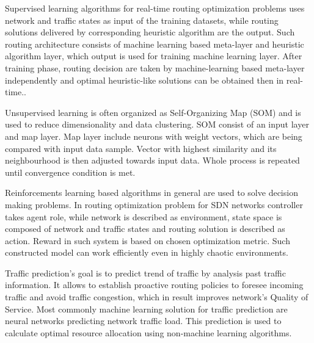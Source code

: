 \documentclass[conference]{IEEEtran}
\begin{document}
Supervised learning algorithms for real-time routing optimization problems uses network and traffic states as input of the training datasets, while routing solutions delivered by corresponding heuristic algorithm are the output. Such routing architecture consists of machine learning based meta-layer and heuristic algorithm layer, which output is used for training machine learning layer. After training phase, routing decision are taken by machine-learning based meta-layer independently and optimal heuristic-like solutions can be obtained then in real-time.\cite{routing3}.\par
Unsupervised learning is often organized as Self-Organizing Map (SOM) and is used to reduce dimensionality and data clustering. SOM consist of an input layer and map layer. Map layer include neurons with weight vectors, which are being compared with input data sample. Vector with highest similarity and its neighbourhood is then adjusted towards input data. Whole process is repeated until convergence condition is met\cite{routing3}.\par
Reinforcements learning based algorithms in general are used to solve decision making problems. In routing optimization problem for SDN networks controller takes agent role, while network is described as environment, state space is composed of network and traffic states and routing solution is described as action. Reward in such system is based on chosen optimization metric. Such constructed model can work efficiently even in highly chaotic environments\cite{routing3}.\par
Traffic prediction's goal is to predict trend of traffic by analysis past traffic information. It allows to establish proactive routing policies to foresee incoming traffic and avoid traffic congestion, which in result improves network's Quality of Service. Most commonly machine learning solution for traffic prediction are neural networks predicting network traffic load. This prediction is used to calculate optimal resource allocation using non-machine learning algorithms\cite{routing3}.\par
\end{document}
